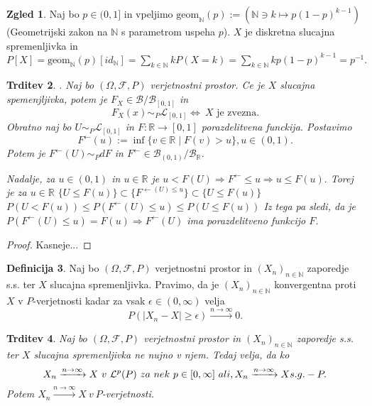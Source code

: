 \documentclass[a4paper,12pt]{article}
\theoremstyle{definition} %
\newtheorem{definicija}{Definicija}[section]
\newtheorem{zgled}[definicija]{Zgled}
\theoremstyle{plain} %
\newtheorem{trditev}[definicija]{Trditev}
\newcommand{\R}{\mathbb{R}}
\newcommand{\N}{\mathbb{N}}
\newcommand{\F}{\mathcal{F}}
\newcommand{\B}{\mathcal{B}}
\newcommand{\Le}{\mathcal{L}}
\begin{document}
        \begin{zgled}
            Naj bo $p \in (0, 1]$ in vpeljimo $\text{geom}_\N(p):= (\N \ni k \mapsto p(1-p)^{k-1})$ (Geometrijski zakon na $\N$ s parametrom uspeha $p$). $X$ je diskretna slucajna spremenljivka in $P[X] = \text{geom}_\N(p)[id_\N] = \sum_{k\in\N}kP(X=k) = \sum_{k\in\N}kp(1-p)^{k-1} = p^{-1}.$
        \end{zgled}

        \begin{trditev}.
            Naj bo $(\Omega, \F, P)$ verjetnostni prostor. Ce je $X$ slucajna spemenjljivka, potem je $F_X \in \B/\B_{[0,1]}$ in 
            $$
                F_X(x) \sim_{P} \Le_{[0, 1]} \iff \ \text{$X$ je zvezna.}
            $$
            Obratno naj bo $U \sim_{P} \Le_{[0,1]}$ in $F:\R \rightarrow [0, 1]$ porazdelitvena funckija. Postavimo 
            $$
                F^\leftarrow(u):= \inf\{v \in \R \mid F(v) > u\}, u\in(0, 1).
            $$
            Potem je $F^\leftarrow(U)\sim_{P} dF$ in $F^\leftarrow \in \B_{(0, 1)}/\B_{\R}$.
            
            \noindent Nadalje, za $u \in (0, 1)$ in $u\in \R$ je $u<F(U) \Rightarrow F^{\leftarrow} \leq u \Rightarrow u \leq F(u).$
            Torej je za $u\in\R$ $\{U\leq F(u)\} \subset \{F^{\leftarrow(U)\leq u}\} \subset \{U\leq F(u)\}$ 
            $P(U< F(u)) \leq P(F^{\leftarrow}(U)\leq u) \leq P(U \leq F(u))$ Iz tega pa sledi, da je $P(F^{\leftarrow}(U) \leq u) = F(u) \Rightarrow F^{\leftarrow}(U)$ ima porazdelitveno funkcijo $F$.
        \end{trditev}

        \begin{proof}
            Kasneje...
        \end{proof}

        \begin{definicija}
            Naj bo $(\Omega, \F, P)$ verjetnostni prostor in $(X_n)_{n\in\N}$ zaporedje s.s. ter $X$ slucajna spremenljivka. Pravimo, da je $(X_n)_{n\in\N}$ konvergentna proti $X$ v $P$-verjetnosti kadar za vsak $\epsilon \in (0, \infty)$ velja
            $$
                P(|X_n - X| \geq \epsilon) \xrightarrow{n\rightarrow\infty} 0.
            $$
        \end{definicija}

        \begin{trditev}
            Naj bo $(\Omega, \F, P)$ verjetnostni prostor in $(X_n)_{n\in\N}$ zaporedje s.s. ter $X$ slucajna spremenljivka ne nujno v njem. Tedaj velja, da ko
            $$
                X_n \xrightarrow{n\rightarrow\infty} X \ v \ \Le^p(P) \ za \ nek \ p \in [0, \infty] \ ali, \\
                X_n \xrightarrow{n\rightarrow\infty} X s.g.-P.
            $$
            Potem $X_n \xrightarrow{n\rightarrow\infty} X \ v \ P$-verjetnosti.
        \end{trditev}
\end{document}
